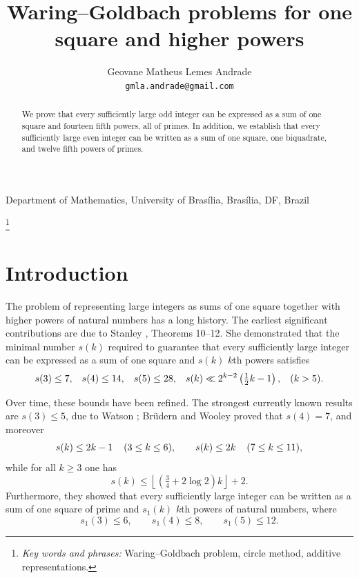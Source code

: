 \documentclass{article}
\title{Waring–Goldbach problems for one square and higher powers}
\author{
  Geovane Matheus Lemes Andrade \\
  \texttt{gmla.andrade@gmail.com}
}
\date{}
\theoremstyle{plain}
\begin{document}
\maketitle

\begin{center}
Department of Mathematics, University of Brasília, Brasília, DF, Brazil
\end{center}

\renewcommand{\thefootnote}{}
\footnote{\textit{Key words and phrases:} Waring–Goldbach problem, circle method, additive representations.}
\renewcommand{\thefootnote}{\arabic{footnote}}

\begin{abstract}
    We prove that every sufficiently large odd integer can be expressed as a sum of one square and fourteen fifth powers, all of primes. In addition, we establish that every sufficiently large even integer can be written as a sum of one square, one biquadrate, and twelve fifth powers of primes.
\end{abstract}

\section{Introduction}

The problem of representing large integers as sums of one square together with higher powers of natural numbers has a long history. The earliest significant contributions are due to Stanley \cite{Stanley1930}, Theorems 10–12. She demonstrated that the minimal number $s(k)$ required to guarantee that every sufficiently large integer can be expressed as a sum of one square and $s(k)$ $k$th powers satisfies
$$s(3) \leq 7, \hspace{0.3cm} s(4) \leq 14, \hspace{0.3cm} s(5) \leq 28, \hspace{0.3cm} s(k) \ll 2^{k-2}\left(\tfrac{1}{2}k-1\right), \hspace{0.3cm} (k>5).$$

Over time, these bounds have been refined. The strongest currently known results are $s(3) \leq 5$, due to Watson \cite{Watson1972}; Br\"udern and Wooley \cite{partiBrudernWooley2024} proved that $s(4)=7$, and moreover
$$s(k) \leq 2k-1 \hspace{0.4cm}(3\leq k \leq 6), \qquad s(k) \leq 2k \hspace{0.4cm}(7\leq k \leq 11),$$
while for all $k\geq 3$ one has
$$s(k) \leq \left\lfloor\left(\tfrac{3}{4}+2\log 2\right)k\right\rfloor+2.$$
Furthermore, they showed that every sufficiently large integer can be written as a sum of one square of prime and $s_1(k)$ $k$th powers of natural numbers, where
$$s_1(3) \leq 6, \qquad s_1(4) \leq 8, \qquad s_1(5) \leq 12.$$
\end{document}
